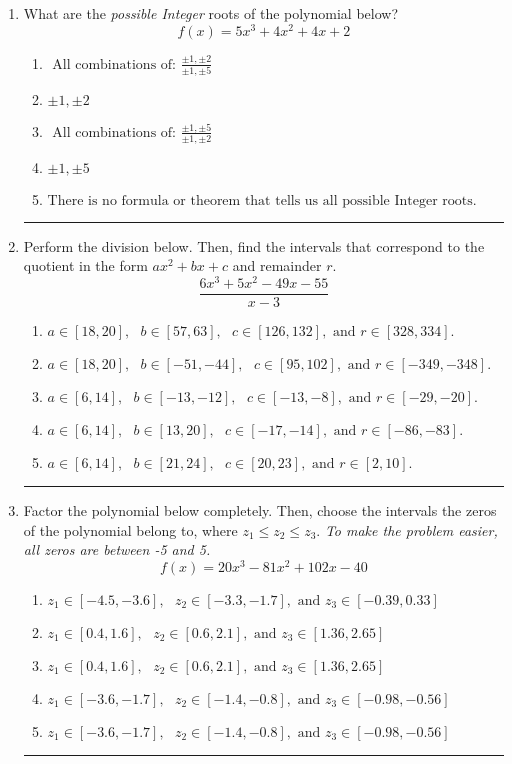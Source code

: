 \documentclass[14pt]{extbook}
\newcommand{\litem}[1]{\item#1\hspace*{-1cm}\rule{\textwidth}{0.4pt}}
\begin{document}
\begin{enumerate}
{\begin{enumerate}[label=\Alph*.]
\end{enumerate} }
\litem{
What are the \textit{possible Integer} roots of the polynomial below?\[ f(x) = 5x^{3} +4 x^{2} +4 x + 2 \]\begin{enumerate}[label=\Alph*.]
\item \( \text{ All combinations of: }\frac{\pm 1,\pm 2}{\pm 1,\pm 5} \)
\item \( \pm 1,\pm 2 \)
\item \( \text{ All combinations of: }\frac{\pm 1,\pm 5}{\pm 1,\pm 2} \)
\item \( \pm 1,\pm 5 \)
\item \( \text{There is no formula or theorem that tells us all possible Integer roots.} \)

\end{enumerate} }
\litem{
Perform the division below. Then, find the intervals that correspond to the quotient in the form $ax^2+bx+c$ and remainder $r$.\[ \frac{6x^{3} +5 x^{2} -49 x -55}{x -3} \]\begin{enumerate}[label=\Alph*.]
\item \( a \in [18, 20], \text{   } b \in [57, 63], \text{   } c \in [126, 132], \text{   and   } r \in [328, 334]. \)
\item \( a \in [18, 20], \text{   } b \in [-51, -44], \text{   } c \in [95, 102], \text{   and   } r \in [-349, -348]. \)
\item \( a \in [6, 14], \text{   } b \in [-13, -12], \text{   } c \in [-13, -8], \text{   and   } r \in [-29, -20]. \)
\item \( a \in [6, 14], \text{   } b \in [13, 20], \text{   } c \in [-17, -14], \text{   and   } r \in [-86, -83]. \)
\item \( a \in [6, 14], \text{   } b \in [21, 24], \text{   } c \in [20, 23], \text{   and   } r \in [2, 10]. \)

\end{enumerate} }
\litem{
Factor the polynomial below completely. Then, choose the intervals the zeros of the polynomial belong to, where $z_1 \leq z_2 \leq z_3$. \textit{To make the problem easier, all zeros are between -5 and 5.}\[ f(x) = 20x^{3} -81 x^{2} +102 x -40 \]\begin{enumerate}[label=\Alph*.]
\item \( z_1 \in [-4.5, -3.6], \text{   }  z_2 \in [-3.3, -1.7], \text{   and   } z_3 \in [-0.39, 0.33] \)
\item \( z_1 \in [0.4, 1.6], \text{   }  z_2 \in [0.6, 2.1], \text{   and   } z_3 \in [1.36, 2.65] \)
\item \( z_1 \in [0.4, 1.6], \text{   }  z_2 \in [0.6, 2.1], \text{   and   } z_3 \in [1.36, 2.65] \)
\item \( z_1 \in [-3.6, -1.7], \text{   }  z_2 \in [-1.4, -0.8], \text{   and   } z_3 \in [-0.98, -0.56] \)
\item \( z_1 \in [-3.6, -1.7], \text{   }  z_2 \in [-1.4, -0.8], \text{   and   } z_3 \in [-0.98, -0.56] \)


\end{enumerate}}
\end{enumerate}
\end{document}
